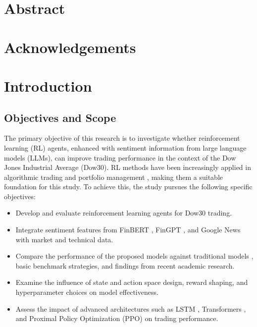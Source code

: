 \documentclass[12pt,a4paper]{report}
\begin{document}

\chapter*{Abstract}

\chapter*{Acknowledgements}

\tableofcontents
\listoffigures
\listoftables


\chapter{Introduction}

\section{Objectives and Scope}

The primary objective of this research is to investigate whether reinforcement learning (RL) agents, enhanced with sentiment information from large language models (LLMs), can improve trading performance in the context of the Dow Jones Industrial Average (Dow30). RL methods have been increasingly applied in algorithmic trading and portfolio management \cite{pricope2021deep}, making them a suitable foundation for this study. To achieve this, the study pursues the following specific objectives:

\begin{itemize}
    \item Develop and evaluate reinforcement learning agents for Dow30 trading.
    \item Integrate sentiment features from FinBERT \cite{araci2019finbert}, FinGPT \cite{yang2023fingpt}, and Google News with market and technical data.
    \item Compare the performance of the proposed models against traditional models \cite{markowitz1952portfolio}, basic benchmark strategies, and findings from recent academic research.
    \item Examine the influence of state and action space design, reward shaping, and hyperparameter choices on model effectiveness.
    \item Assess the impact of advanced architectures such as LSTM \cite{hochreiter1997lstm}, Transformers \cite{vaswani2017attention}, and Proximal Policy Optimization (PPO) \cite{schulman2017proximal} on trading performance.
\end{itemize}
\end{document}
